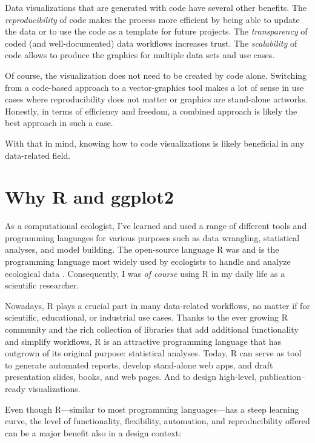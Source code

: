 \documentclass[
]{krantz}
\begin{document}
Data visualizations that are generated with code have several other benefits. The \emph{reproducibility} of code makes the process more efficient by being able to update the data or to use the code as a template for future projects. The \emph{transparency} of coded (and well-documented) data workflows increases trust. The \emph{scalability} of code allows to produce the graphics for multiple data sets and use cases.

Of course, the visualization does not need to be created by code alone. Switching from a code-based approach to a vector-graphics tool makes a lot of sense in use cases where reproducibility does not matter or graphics are stand-alone artworks. Honestly, in terms of efficiency and freedom, a combined approach is likely the best approach in such a case.

With that in mind, knowing how to code visualizations is likely beneficial in any data-related field.

\hypertarget{why}{%
\section{\texorpdfstring{Why R and \textbf{ggplot2}}{Why R and ggplot2}}\label{why}}

As a computational ecologist, I've learned and used a range of different tools and programming languages for various purposes such as data wrangling, statistical analyses, and model building. The open-source language R was and is the programming language most widely used by ecologists to handle and analyze ecological data \citep{sciaini2018}. Consequently, I was \emph{of course} using R in my daily life as a scientific researcher.

Nowadays, R plays a crucial part in many data-related workflows, no matter if for scientific, educational, or industrial use cases. Thanks to the ever growing R community and the rich collection of libraries that add additional functionality and simplify workflows, R is an attractive programming language that has outgrown of its original purpose: statistical analyses. Today, R can serve as tool to generate automated reports, develop stand-alone web apps, and draft presentation slides, books, and web pages. And to design high-level, publication--ready visualizations.

Even though R---similar to most programming languages---has a steep learning curve, the level of functionality, flexibility, automation, and reproducibility offered can be a major benefit also in a design context:
\end{document}
